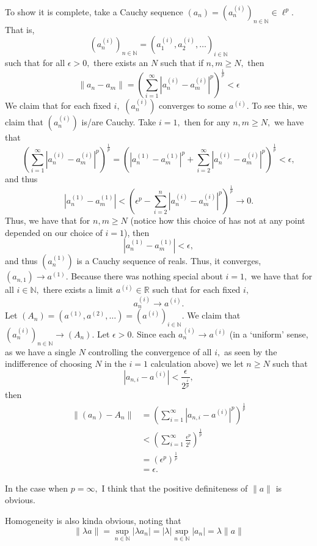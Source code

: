 \documentclass[11pt]{article}
\newcommand{\bbN}{\mathbb{N}}
\newcommand{\bbR}{\mathbb{R}}
\begin{document}
\begin{solution}
    To show it is complete, take a Cauchy sequence $(a_n) = (a_{n}^{(i)})_{n\in \bbN} \in \ell^p.$ That is, \[(a_{n}^{(i)})_{n\in \bbN} = (a_{1}^{(i)}, a_{2}^{(i)}, \dots)_{i\in \bbN}\] such that for all $\epsilon>0,$ there exists an $N$ such that if $n,m\geq N,$ then
    \[\|a_n - a_m\| = \left(\sum_{i=1}^\infty|a_{n}^{(i)} - a_{m}^{(i)}|^p\right)^{\frac{1}{p}} < \epsilon\] We claim that for each fixed $i,$ $(a_{n}^{(i)})$ converges to some $a^{(i)}.$ To see this, we claim that $(a_{n}^{(i)})$ is/are Cauchy. Take $i =1,$ then for any $n,m \geq N,$ we have that 
    \[\left(\sum_{i=1}^\infty|a_{n}^{(i)} - a_{m}^{(i)}|^p\right)^{\frac{1}{p}} = \left(|a_{n}^{(1)} - a_{m}^{(1)}|^p + \sum_{i=2}^\infty|a_{n}^{(i)} - a_{m}^{(i)}|^p\right)^{\frac{1}{p}}< \epsilon,\] and thus
    \[|a_{n}^{(1)} - a_{m}^{(1)}| < \left(\epsilon^p - \sum_{i=2}^n|a_{n}^{(i)} - a_{m}^{(i)}|^p\right)^{\frac{1}{p}} \to 0.\] Thus, we have that for $n, m\geq N$ (notice how this choice of has not at any point depended on our choice of $i = 1$), then
    \[|a_{n}^{(1)} - a_{m}^{(1)}| < \epsilon,\] and thus $(a_{n}^{(1)})$ is a Cauchy sequence of reals. Thus, it converges, $(a_{n,1}) \to a^{(1)}.$ Because there was nothing special about $i=1,$ we have that for all $i \in \bbN,$ there exists a limit $a^{(i)}\in \bbR$ such that for each fixed $i,$ \[a_{n}^{(i)} \to a^{(i)}.\] Let $(A_n) = (a^{(1)}, a^{(2)}, \dots) = (a^{(i)})_{i\in \bbN}.$ We claim that $(a_{n}^{(i)})_{n\in \bbN} \to (A_n).$ Let $\epsilon>0.$ Since each $a_{n}^{(i)} \to a^{(i)}$ (in a `uniform' sense, as we have a single $N$ controlling the convergence of all $i,$ as seen by the indifference of choosing $N$ in the $i=1$ calculation above) we let $n\geq N$ such that \[|a_{n,i} - a^{(i)}|< \frac{\epsilon}{2^{\frac{i}{p}}},\] then 
    \begin{align*}
        \|(a_n) - A_n\| &= \left(\sum_{i=1}^\infty |a_{n,i} - a^{(i)}|^p\right)^{\frac{1}{p}}\\
        &< \left(\sum_{i=1}^\infty \frac{\epsilon^p}{2^{i}}\right)^{\frac{1}{p}}\\
        &= (\epsilon^p)^\frac{1}{p}\\
        &= \epsilon.
    \end{align*}

    In the case when $p = \infty,$ I think that the positive definiteness of $\|a\|$ is obvious. 
    
    Homogeneity is also kinda obvious, noting that 
    \[\|\lambda a\| = \sup_{n\in \bbN}|\lambda a_n| = |\lambda|\sup_{n\in \bbN}|a_n| = \lambda \|a\|\] 


\end{solution}
\end{document}
